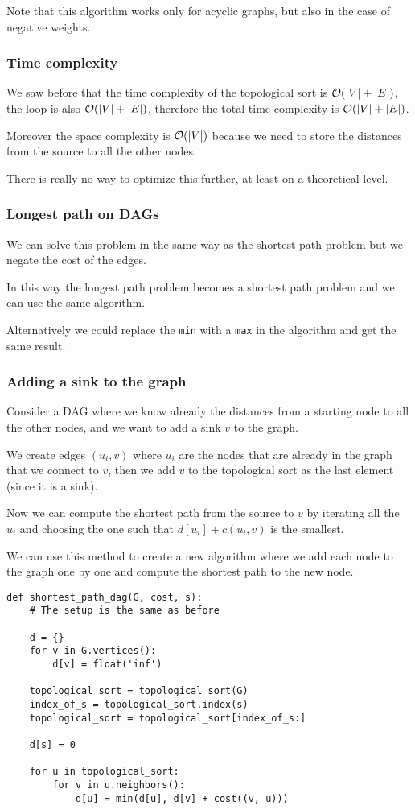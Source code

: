 \documentclass[12pt]{extarticle}
\begin{document}
Note that this algorithm works only for acyclic graphs, but also in the case of negative weights.

\subsubsection{Time complexity}

We saw before that the time complexity of the topological sort is $\mathcal{O}(|V| + |E|)$, the loop is also $\mathcal{O}(|V| + |E|)$, therefore the total time complexity is $\mathcal{O}(|V| + |E|)$.

Moreover the space complexity is $\mathcal{O}(|V|)$ because we need to store the distances from the source to all the other nodes.

There is really no way to optimize this further, at least on a theoretical level.

\subsubsection{Longest path on DAGs}

We can solve this problem in the same way as the shortest path problem but we negate the cost of the edges.

In this way the longest path problem becomes a shortest path problem and we can use the same algorithm.

Alternatively we could replace the \texttt{min} with a \texttt{max} in the algorithm and get the same result.

\subsubsection{Adding a sink to the graph}

Consider a DAG where we know already the distances from a starting node to all the other nodes, and we want to add a sink $v$ to the graph.

We create edges $(u_i, v)$ where $u_i$ are the nodes that are already in the graph that we connect to $v$, then we add $v$ to the topological sort as the last element (since it is a sink).

Now we can compute the shortest path from the source to $v$ by iterating all the $u_i$ and choosing the one such that $d[u_i] + c(u_i, v)$ is the smallest.

We can use this method to create a new algorithm where we add each node to the graph one by one and compute the shortest path to the new node.

\begin{verbatim}
def shortest_path_dag(G, cost, s):
    # The setup is the same as before

    d = {}
    for v in G.vertices():
        d[v] = float('inf')

    topological_sort = topological_sort(G)
    index_of_s = topological_sort.index(s)
    topological_sort = topological_sort[index_of_s:]

    d[s] = 0

    for u in topological_sort:
        for v in u.neighbors():
            d[u] = min(d[u], d[v] + cost((v, u)))
\end{verbatim}
\end{document}

